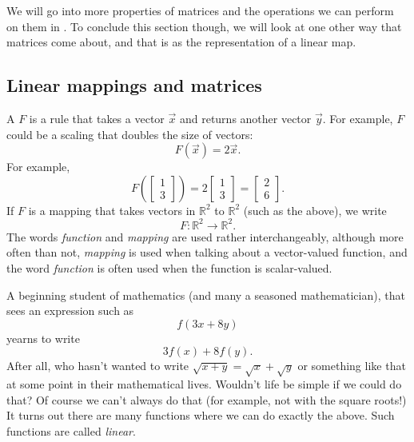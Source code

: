 \documentclass{ximera}
\begin{document}
We will go into more properties of matrices and the operations we can perform on them in . To conclude this section though, we will look at one other way that matrices come about, and that is as the representation of a linear map.

\subsection{Linear mappings and matrices}

A \emph{} $F$ is a rule that takes a vector $\vec{x}$ and returns another vector $\vec{y}$.  For example, $F$ could be a scaling that doubles the size of vectors:
\begin{equation*}
    F(\vec{x}) = 2 \vec{x} .
\end{equation*}
For example,
\begin{equation*}
    F \left( \begin{bmatrix} 1 \\ 3 \end{bmatrix} \right)
    = 2 \begin{bmatrix} 1 \\ 3 \end{bmatrix}
    = \begin{bmatrix} 2 \\ 6 \end{bmatrix} .
\end{equation*}
If $F$ is a mapping that takes vectors in ${\mathbb R}^2$ to ${\mathbb R}^2$ (such as the above), we write
\begin{equation*}
    F \colon {\mathbb R}^2 \to {\mathbb R}^2 .
\end{equation*}
The words \emph{function} and \emph{mapping} are used rather interchangeably, although more often than not, \emph{mapping} is used when talking about a vector-valued function, and the word \emph{function} is often used when the function is scalar-valued.

A beginning student of mathematics (and many a seasoned mathematician), that sees an expression such as
\begin{equation*}
    f(3x+8y)
\end{equation*}
yearns to write
\begin{equation*}
    3f(x)+8f(y) .
\end{equation*}
After all, who hasn't wanted to write $\sqrt{x+y} = \sqrt{x} + \sqrt{y}$ or something like that at some point in their mathematical lives. Wouldn't life be simple if we could do that? Of course we can't always do that (for example, not with the square roots!) It turns out there are many functions where we can do exactly the above.  Such functions are called \emph{linear}.
\end{document}
